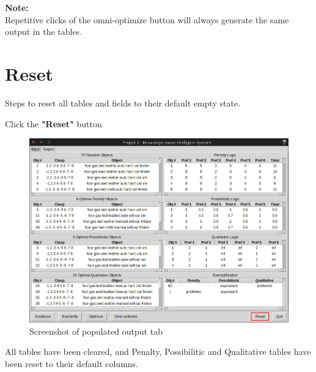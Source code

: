 \documentclass[12pt]{report}
\begin{document}
\textbf{Note:} \\
Repetitive clicks of the omni-optimize button will always generate the same output in the tables.

\newpage
\chapter{Reset}
Steps to reset all tables and fields to their default empty state.\\

\begin{description}[leftmargin=4em]
\item [Step 1:]  Click the \textbf{"Reset"} button
\end{description}
\begin{figure}[H]
\begin{center}
\includegraphics[scale=0.3,trim=1cm 1cm 1cm 1cm]{reset}
\caption{Screenshot of populated output tab}
\end{center}
\end{figure}
\vspace{-2.5em}
\begin{description}[leftmargin=4em]
\item [Result:] All tables have been cleared, and Penalty, Possibilitic and Qualitative tables have been reset to their default columns.
\end{description}
\end{document}
